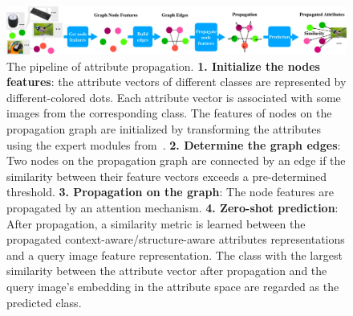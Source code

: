 \documentclass[letterpaper]{article} %
\begin{document}
\begin{figure}[t!]
\begin{center}
\includegraphics[width=2\columnwidth]{pipeline-crop.pdf}
\end{center}
\caption{
The pipeline of attribute propagation. \textbf{1. Initialize the nodes features}: the attribute vectors of different classes  are represented by different-colored dots. Each attribute vector is associated with some images from the corresponding class. The features of nodes on the propagation graph are initialized by transforming the attributes using the expert modules from~\cite{zhang2019co}. \textbf{2. Determine the graph edges}: Two nodes on the propagation graph are connected by an edge if the similarity between their feature vectors exceeds a pre-determined threshold. \textbf{3. Propagation on the graph}: The node features are propagated by an attention mechanism. \textbf{4. Zero-shot prediction}: After propagation, a similarity metric is learned between the propagated context-aware/structure-aware attributes representations and a query image feature representation. The class with the largest similarity between the attribute vector after propagation and the query image's embedding in the attribute space are regarded as the predicted class.
}
\label{fig:spn}
\end{figure}
\end{document}
